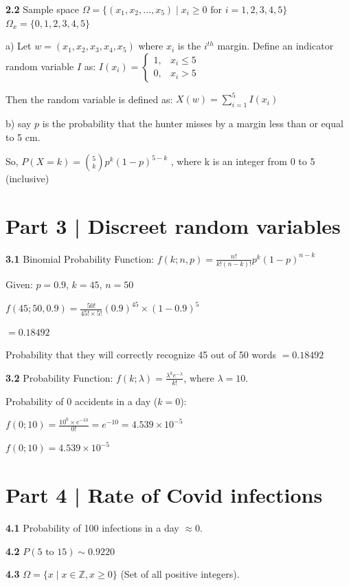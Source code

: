 \documentclass[12pt, letterpaper]{article}
\begin{document}
\textbf{2.2}
Sample space $\Omega = \{ (x_1, x_2, \dots, x_5) \mid x_i \ge 0 \text{ for } i=1,2,3,4,5 \}$
\newline
$\Omega_x = \{ 0, 1, 2, 3, 4, 5 \}$

a) Let $w = (x_1, x_2, x_3, x_4, x_5)$ where $x_i$ is the $i^{th}$ margin.
Define an indicator random variable $I$ as:
$I(x_i) = \begin{cases} 1, & x_i \le 5 \\ 0, & x_i > 5 \end{cases}$

Then the random variable is defined as:
$X(w) = \sum_{i=1}^{5} I(x_i)$

b) say $p$ is the probability that the hunter misses by a margin less than or equal to 5 cm.

So, $P(X=k) = \binom{5}{k} p^k (1-p)^{5-k}$ , where k is an integer from 0 to 5 (inclusive)

\section*{Part 3 | Discreet random variables}

\textbf{3.1} Binomial Probability Function: $f(k; n, p) = \frac{n!}{k!(n-k)!} p^k (1-p)^{n-k}$

Given: $p = 0.9$, $k = 45$, $n = 50$

$f(45; 50, 0.9) = \frac{50!}{45! \times 5!} (0.9)^{45} \times (1-0.9)^{5}$

$= 0.18492$

Probability that they will correctly recognize 45 out of 50 words $= 0.18492$

\textbf{3.2} Probability Function: $f(k; \lambda) = \frac{\lambda^k e^{-\lambda}}{k!}$, where $\lambda = 10$.

Probability of 0 accidents in a day ($k=0$):

$f(0; 10) = \frac{10^0 \times e^{-10}}{0!} = e^{-10} = 4.539 \times 10^{-5}$

$f(0; 10) = 4.539 \times 10^{-5}$

\section*{Part 4 | Rate of Covid infections}

\textbf{4.1} Probability of 100 infections in a day $\approx 0$.

\textbf{4.2} $P(5 \text{ to } 15) \sim 0.9220$

\textbf{4.3} $\Omega = \{ x \mid x \in \mathbb{Z}, x \ge 0 \}$ (Set of all positive integers).
\end{document}

